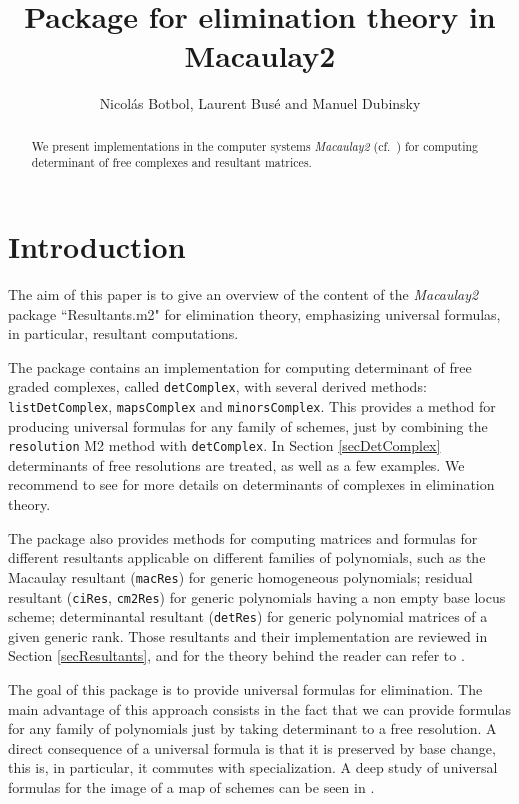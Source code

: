 \documentclass[10pt]{amsart}
\title{Package for elimination theory in Macaulay2}
\author{Nicol\'as Botbol, Laurent Bus\'e and  Manuel Dubinsky}
\theoremstyle{plain}
\theoremstyle{definition}
\begin{document}

\maketitle

\begin{abstract} 
We present implementations in the computer systems \textit{Macaulay2} (cf.\ \cite{M2}) for computing determinant of free complexes and resultant matrices.
\end{abstract}


\section{Introduction}\label{secIntro}
The aim of this paper is to give an overview of the content of the \textit{Macaulay2} package ``Resultants.m2" for elimination theory, emphasizing universal formulas, in particular, resultant computations. 

The package contains an implementation for computing determinant of free graded complexes, called \texttt{detComplex}, with several derived methods: \texttt{listDetComplex}, \texttt{mapsComplex} and \texttt{minorsComplex}. This provides a method for producing universal formulas for any family of schemes, just by combining the \texttt{resolution} M2 method with \texttt{detComplex}. In Section \ref{secDetComplex} determinants of free resolutions are treated, as well as a few examples. We recommend to see \cite{Dem84, Jou95, GKZ94, Buse1} for more details on determinants of complexes in elimination theory.

The package also provides methods for computing matrices and formulas for different resultants applicable on different families of polynomials, such as the Macaulay resultant (\texttt{macRes}) for generic homogeneous polynomials; residual resultant (\texttt{ciRes}, \texttt{cm2Res}) for generic polynomials having a non empty base locus scheme;
determinantal resultant  (\texttt{detRes}) for generic polynomial matrices of a given generic rank. Those resultants and their implementation are reviewed in Section \ref{secResultants}, and for the theory behind the reader can refer to \cite{Jou91, Cha1, GKZ94, Jou95, Jou97, CLO98, BEM01, BusPhD, Buse1, Bus04}.

The goal of this package is to provide universal formulas for elimination. The main advantage of this approach consists in the fact that we can provide formulas for any family of polynomials just by taking determinant to a free resolution. A direct consequence of a universal formula is that it is preserved by base change, this is, in particular, it commutes with specialization. A deep study of universal formulas for the image of a map of schemes can be seen in \cite[Chapter V]{EH00}.
\end{document}
